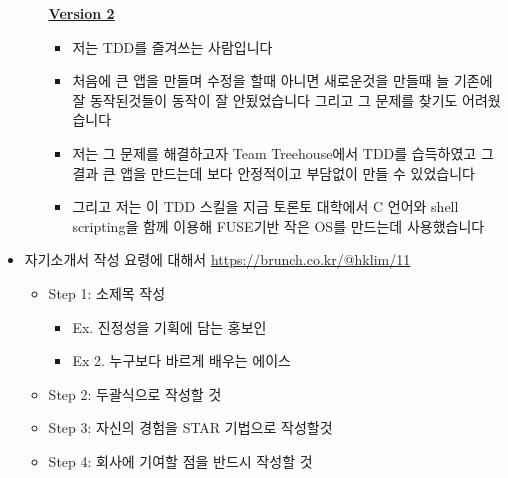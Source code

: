 \documentclass[12pt]{article}
\begin{document}
\begin{itemize}
\begin{itemize}
        \bigskip

        \underline{\textbf{Version 2}}

        \bigskip

        \begin{itemize}
            \item 저는 TDD를 즐겨쓰는 사람입니다
            \item 처음에 큰 앱을 만들며 수정을 할때 아니면 새로운것을 만들때 늘 기존에 잘 동작된것들이 동작이 잘 안됬었습니다 그리고 그 문제를 찾기도 어려웠습니다
            \item 저는 그 문제를 해결하고자 Team Treehouse에서 TDD를 습득하였고 그 결과
            큰 앱을 만드는데 보다 안정적이고 부담없이 만들 수 있었습니다
            \item 그리고 저는 이 TDD 스킬을 지금 토론토 대학에서 C 언어와 shell scripting을 함께 이용해 FUSE기반 작은 OS를 만드는데 사용했습니다
        \end{itemize}
    \end{itemize}
    \item 자기소개서 작성 요령에 대해서 \href{link}{https://brunch.co.kr/@hklim/11}
    \begin{itemize}
        \item Step 1: 소제목 작성
        \begin{itemize}
            \item Ex. 진정성을 기휙에 담는 홍보인
            \item Ex 2. 누구보다 바르게 배우는 에이스
        \end{itemize}
        \item Step 2: 두괄식으로 작성할 것
        \item Step 3: 자신의 경험을 STAR 기법으로 작성할것
        \item Step 4: 회사에 기여할 점을 반드시 작성할 것
    \end{itemize}
\end{itemize}
\end{document}

